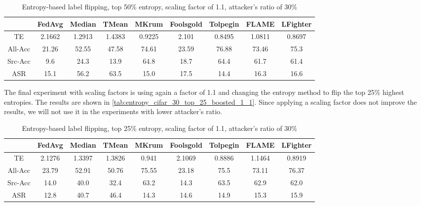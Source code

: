 \begin{table}[h!]
        \centering
        \small
        \begin{adjustbox}{center}
        \begin{tabular}{|c|c|c|c|c|c|c|c|c|}
            \hline
            & FedAvg & Median & TMean & MKrum & Foolsgold & Tolpegin & FLAME & LFighter \\
            \hline
            TE & 2.1662 & 1.2913 & 1.4383 & 0.9225 & 2.101 & 0.8495 & 1.0811 & 0.8697 \\
            \hline
            All-Acc & 21.26 & 52.55 & 47.58 & 74.61 & 23.59 & 76.88 & 73.46 & 75.3 \\
            \hline
            Src-Acc & 9.6 & 24.3 & 13.9 & 64.8 & 18.7 & 64.4 & 61.7 & 61.4 \\
            \hline
            ASR & 15.1 & 56.2 & 63.5 & 15.0 & 17.5 & 14.4 & 16.3 & 16.6 \\
            \hline
        \end{tabular}
        \end{adjustbox}
        \caption{Entropy-based label flipping, top 50\% entropy, scaling factor of 1.1, attacker's ratio of 30\%}
        \label{tab:entropy_cifar_30_top_50_boosted_1_1}
    \end{table}
    
The final experiment with scaling factors is using again a factor of 1.1 and changing the entropy method to flip the top 25\% highest entropies. The results are shown in \autoref{tab:entropy_cifar_30_top_25_boosted_1_1}.
Since applying a scaling factor does not improve the results, we will not use it in the experiments with lower attacker's ratio.
\begin{table}[h!]
        \centering
        \small
        \begin{adjustbox}{center}
        \begin{tabular}{|c|c|c|c|c|c|c|c|c|}
            \hline
            & FedAvg & Median & TMean & MKrum & Foolsgold & Tolpegin & FLAME & LFighter \\
            \hline
            TE & 2.1276 & 1.3397 & 1.3826 & 0.941 & 2.1069 & 0.8886 & 1.1464 & 0.8919 \\
            \hline
            All-Acc & 23.79 & 52.91 & 50.76 & 75.55 & 23.18 & 75.5 & 73.11 & 76.37 \\
            \hline
            Src-Acc & 14.0 & 40.0 & 32.4 & 63.2 & 14.3 & 63.5 & 62.9 & 62.0 \\
            \hline
            ASR & 12.8 & 40.7 & 46.4 & 14.3 & 14.6 & 14.9 & 15.3 & 15.9 \\
            \hline
        \end{tabular}
        \end{adjustbox}
        \caption{Entropy-based label flipping, top 25\% entropy, scaling factor of 1.1, attacker's ratio of 30\%}
        \label{tab:entropy_cifar_30_top_25_boosted_1_1}
    \end{table}
    

